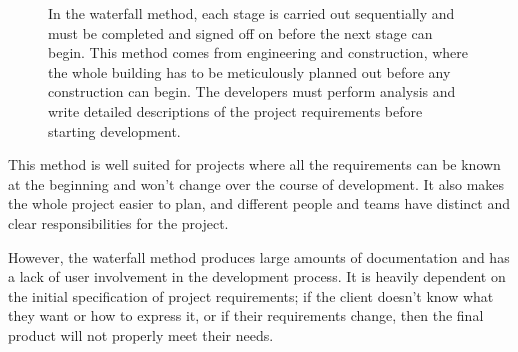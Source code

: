 \documentclass[../main.tex]{subfile}
\begin{document}


\begin{figure}[H]
	\begin{minipage}{0.38\linewidth}
		In the waterfall method, each stage is carried out sequentially and must be completed and signed off on before the next stage can begin. This method comes from engineering and construction, where the whole building has to be meticulously planned out before any construction can begin. The developers must perform analysis and write detailed descriptions of the project requirements before starting development.
	\end{minipage}\hfill
	\begin{minipage}{0.6\linewidth}
		\centering
	\end{minipage}
\end{figure}

This method is well suited for projects where all the requirements can be known at the beginning and won't change over the course of development. It also makes the whole project easier to plan, and different people and teams have distinct and clear responsibilities for the project.

However, the waterfall method produces large amounts of documentation and has a lack of user involvement in the development process. It is heavily dependent on the initial specification of project requirements; if the client doesn't know what they want or how to express it, or if their requirements change, then the final product will not properly meet their needs.
\end{document}
